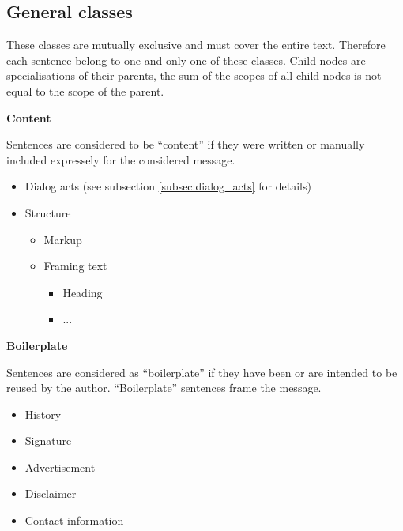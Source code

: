\subsection{General classes}

These classes are mutually exclusive and must cover the entire text. Therefore each sentence belong to one and only one of these classes. Child nodes are specialisations of their parents, the sum of the scopes of all child nodes is not equal to the scope of the parent.

\vspace{0.5cm}
\textbf{Content}
\vspace{0.1cm}

Sentences are considered to be ``content'' if they were written or manually included expressely for the considered message.

\begin{itemize}
	\item Dialog acts (see subsection \ref{subsec:dialog_acts} for details)
	\item Structure
		\begin{itemize}
			\item Markup
			\item Framing text
				\begin{itemize}
					\item Heading
					\item ...
				\end{itemize}
		\end{itemize}
\end{itemize}

\textbf{Boilerplate}
\vspace{0.1cm}

Sentences are considered as ``boilerplate'' if they have been or are intended to be reused by the author. ``Boilerplate'' sentences frame the message.

\begin{itemize}
	\item History
	\item Signature
	\item Advertisement
	\item Disclaimer
	\item Contact information
\end{itemize}